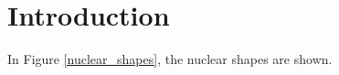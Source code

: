 \chapter{Introduction}
\lipsum[1]
\par In Figure \ref{nuclear_shapes}, the nuclear shapes are shown.
\lipsum[1-2]
